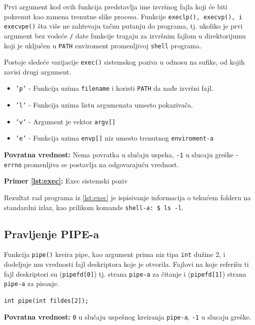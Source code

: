 \documentclass[a4paper, 11pt, twoside]{article}
\newcommand{\scode}[3] {
	\hspace{.06\textwidth} 
	\begin{minipage}[t]{.88\textwidth} %
		\begin{mdframed}[topline=true,bottomline=true,leftline=true,rightline=true,backgroundcolor=gray!22, linecolor=gray!60!black,roundcorner=1mm]
			 

	\begin{center}
		\caption{\textbf{Primer \ref{lst:#3}:} #2}
	\end{center}
	\end{mdframed}
	\end{minipage}

}
\begin{document}
Prvi argument kod ovih funkcija predstavlja ime izvršnog fajla koji će biti pokrenut kao zamena trenutne slike procesa. Funkcije \texttt{execlp(), execvp(), i execvpe()} šta više ne zahtevaju tačnu putanju do programa, tj. ukoliko je prvi argument bez vodeće \texttt{/} date funkcije tragaju za izvršnim fajlom u direktorijumu koji je uključen u \texttt{PATH} enviroment promenljivoj \texttt{shell} programa.
	
Postoje sledeće varijacije \texttt{exec()} sistemskog poziva u odnosu na sufiks, od kojih zavisi drugi argument.

\begin{itemize}[]
	\item{\texttt{'p'} - Funkcija uzima \texttt{filename} i koristi \texttt{PATH} da nađe izvršni fajl.}
	\item{\texttt{'l'} - Funkcija uzima listu argumenata umesto pokazivača.}
	\item{\texttt{'v'} - Argument je vektor \texttt{argv[]}}
	\item{\texttt{'e'} - Funkcija uzima \texttt{envp[]} niz umesto trenutnog \texttt{enviroment-a}}
\end{itemize}

\textbf{Povratna vrednost:} Nema povratka u slučaju uspeha, \texttt{-1} u slucaju greške - \texttt{errno} promenljiva se postavlja na odgovarajuću vrednost.

\vspace{-1mm} 
\scode{exec.c}{Exec sistemski poziv}{exec}

\vspace{2mm} 
Rezultat rad programa iz \ref{lst:exec} je ispisivanje informacija o tekućem folderu na standardni izlaz, kao prilikom komande \texttt{shell-a: \$ ls -l}.

\newpage
\subsection{Pravljenje PIPE-a}
Funkcija \texttt{pipe()} kreira pipe, kao argument prima niz tipa \texttt{int} dužine 2, i dodeljuje mu vrednosti fajl deskriptora koje je otvorila. Fajlovi na koje referišu ti fajl deskriptori su (\texttt{pipefd[0]}) tj. strana \texttt{pipe-a} za čitanje i (\texttt{pipefd[1]}) strana \texttt{pipe-a} za pisanje.  
\begin{center}
	\texttt{int pipe(int fildes[2]);}
\end{center}

\textbf{Povratna vrednost:} \texttt{0} u slučaju uspešnog kreiranja \texttt{pipe-a}, \texttt{-1} u slucaju greške.
\end{document}
